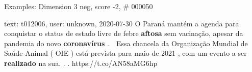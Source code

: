\begin{frame}{Examples: Dimension 3 neg, score -2, \# 000050}
\footnotesize
\begin{alertblock}{text: t012006, user: unknown, 2020-07-30}
O Paraná mantém a agenda para conquistar o status de estado livre de febre 
\textbf{aftosa} sem vacinação, apesar da pandemia do novo \textbf{coronavírus} 
.  ⁣ ⁣ Essa chancela da Organização Mundial de Saúde Animal ( OIE 
) está prevista para maio de 2021 , com um evento a ser \textbf{realizado} na 
sua. . . https://t.co/AN58aMG6hp 
\end{alertblock}
\end{frame}
